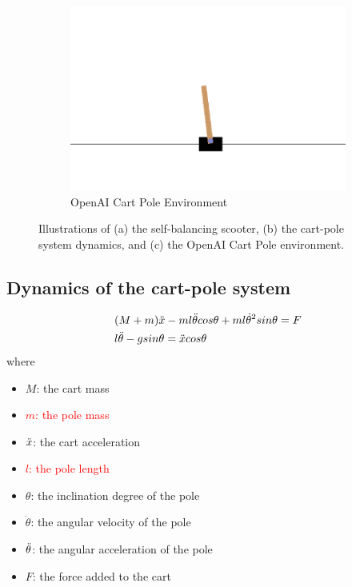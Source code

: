 \documentclass[10pt,a4paper]{article}
\begin{document}
\begin{figure}[H]
\begin{subfigure}[b]{0.3\textwidth}
		\includegraphics[width=\textwidth]{figure/open-ai}
		\caption{OpenAI Cart Pole Environment}
		\label{fig:openai}
	\end{subfigure}
	\caption{Illustrations of (a) the self-balancing scooter, (b) the cart-pole system dynamics, and (c) the OpenAI Cart Pole environment.}
	\label{fig:three graphs}
\end{figure}

\subsection*{Dynamics of the cart-pole system}
\begin{subequations}
\label{eq:dynamics}
\begin{align}
&(M + m)\Ddot{x} - ml\Ddot{\theta}cos\theta + ml\dot{\theta}^2sin\theta = F \\
&l\Ddot{\theta} - gsin\theta = \Ddot{x}cos\theta
\end{align}
\end{subequations}
where
\begin{multicols}{2}
\begin{itemize}
    \item $M$: the cart mass
    \item \textcolor{red}{$m$: the pole mass}
    \item $\Ddot{x}$: the cart acceleration 
    \item \textcolor{red}{$l$: the pole length}
    \item $\theta$: the inclination degree of the pole
    \item $\dot{\theta}$: the angular velocity of the pole
    \item $\Ddot{\theta}$: the angular acceleration of the pole
    \item $F$: the force added to the cart
\end{itemize}
\end{multicols}
\end{document}
